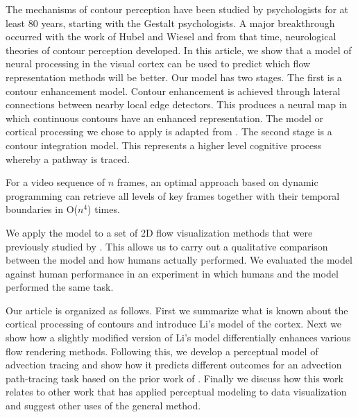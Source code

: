 \documentclass[prodmode,acmtap]{acmlarge}
\begin{document}
The mechanisms of contour perception have been studied by
psychologists for at least 80 years, starting with the Gestalt
psychologists. A major breakthrough occurred with the work of Hubel
and Wiesel \citeyear{Hubel1962,Hubel1968} and from that time,
neurological theories of contour perception developed. In this
article, we show that a model of neural processing in the visual
cortex  can be used to predict which flow representation methods will
be better. Our model has two stages. The first is a contour
enhancement model. Contour enhancement is achieved through lateral
connections between nearby local edge detectors. This produces a
neural map in which continuous contours have an enhanced
representation. The model or cortical processing we chose to apply is
adapted from . The second stage is a contour
integration model. This represents a higher level cognitive process
whereby a pathway is traced.
\begin{theorem}
For a video sequence of $n$ frames, an optimal approach based on
dynamic programming can retrieve all levels of key frames together
with their temporal boundaries in O($n^4$) times.
\end{theorem}

We apply the model to a set of 2D flow visualization methods that
were previously studied by . This allows us to
carry out a qualitative comparison between the model and how humans
actually performed. We evaluated the model against human performance
in an experiment in which humans and the model performed the same task.

Our article is organized as follows. First we summarize what is
known about the cortical processing of contours and introduce Li's
\citeyear{Li1998a} model of the cortex. Next we show how a slightly
modified version of Li's model differentially enhances various flow
rendering methods. Following this, we develop a perceptual model of
advection tracing and show how it predicts different outcomes for an
advection path-tracing task based on the prior work of
. Finally we discuss how this work relates to
other work that has applied perceptual modeling to data visualization
and suggest other uses of the general method.
\end{document}
